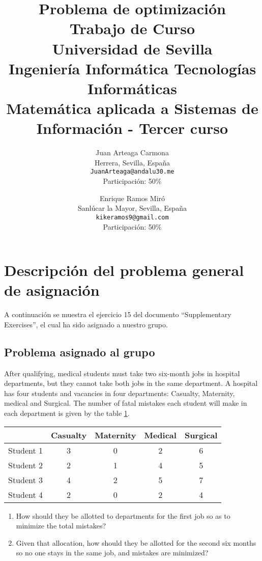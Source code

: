 \documentclass[11pt]{article}
\title{
        \textbf{Problema de optimización}\\
        \medskip
        \large{Trabajo de Curso}\\
        \bigskip
        Universidad de Sevilla\\ Ingeniería Informática Tecnologías Informáticas\\
        Matemática aplicada a Sistemas de Información - Tercer curso}
\author{
Juan Arteaga Carmona\\
Herrera, Sevilla, España \\
\texttt{JuanArteaga@andalu30.me}\\
Participación: 50\%
\and
Enrique Ramos Miró\\
Sanlúcar la Mayor, Sevilla, España \\
\texttt{kikeramos9@gmail.com}\\
Participación: 50\%
}
\begin{document}
\maketitle
\newpage

\tableofcontents
\listoftables
\newpage

\section{Descripción del problema general de asignación}
A continuación se muestra el ejercicio 15 del documento ``Supplementary Exercises'', el cual ha sido asignado a nuestro grupo.

\subsection{Problema asignado al grupo}\label{sec:probasig}
After qualifying, medical students must take two six-month jobs in hospital departments, but they cannot take both jobs in the same department. A hospital has four students and vacancies in four departments: Casualty, Maternity, medical and Surgical. The number of fatal mistakes each student will make in each department is given by the table \ref{tab:tablaProblema}.

\begin{table}[h!]
\centering
\begin{tabular}{@{}lcccc@{}}
\toprule
 & \multicolumn{1}{l}{Casualty} & \multicolumn{1}{l}{Maternity} & \multicolumn{1}{l}{Medical} & \multicolumn{1}{l}{Surgical} \\ \midrule
Student 1 & 3 & 0 & 2 & 6 \\
Student 2 & 2 & 1 & 4 & 5 \\
Student 3 & 4 & 2 & 5 & 7 \\
Student 4 & 2 & 0 & 2 & 4 \\ \bottomrule
\end{tabular}
\label{tab:tablaProblema}
\end{table}

\begin{enumerate}
    \item How should they be allotted to departments for the first job so as to minimize the total mistakes?
    \item Given that allocation, how should they be allotted for the second six months so no one stays in the same job, and mistakes are minimized?
\end{enumerate}
\end{document}
